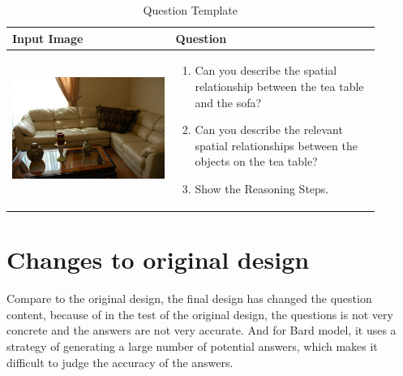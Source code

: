 \documentclass[twocolumn,11pt]{report}
\begin{document}
\begin{table}[ht]
    \centering
    \caption{Question Template}
    \label{tab:question_template_original}
    \begin{tabular}{|p{0.4\linewidth}|p{0.5\linewidth}|}
        \hline
        \textbf{Input Image} &\textbf{Question}\\
        \hline
        \begin{center} \includegraphics[width=\linewidth]{./pic/000000573553.jpg} \end{center}
        & \begin{enumerate}
            \item Can you describe the spatial relationship between the tea table and the sofa?
            \item Can you describe the relevant spatial relationships between the objects on the tea table?
            \item Show the Reasoning Steps.
        \end{enumerate}\\
        \hline
        \end{tabular}
\end{table}


\section{Changes to original design}

Compare to the original design, the final design has changed the question content, because of in the test of the original design, the questions is not very concrete and the answers are not very accurate. And for Bard model, it uses a strategy of generating a large number of potential answers, which makes it difficult to judge the accuracy of the answers.
\end{document}
